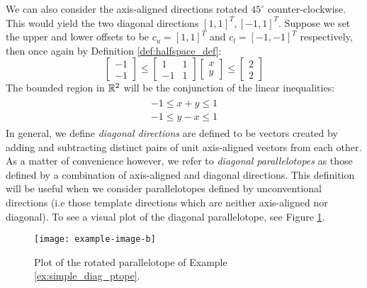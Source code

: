 \begin{example}
  \label{ex:simple_diag_ptope}
  We can also consider the axis-aligned directions rotated $45^\circ$ counter-clockwise. This would yield the two diagonal directions $[1,1]^T, [-1,1]^T$. Suppose we set the upper and lower offsets to be $c_u = [1,1]^T$ and $c_l = [-1,-1]^T$ respectively, then once again by Definition \ref{def:halfspace_def}:
  \begin{equation}
  \begin{bmatrix}
    -1 \\ -1
  \end{bmatrix} \leq \begin{bmatrix}
      1 & 1 \\ -1 & 1
    \end{bmatrix}\begin{bmatrix}
     x \\ y
    \end{bmatrix} \leq \begin{bmatrix}
      2 \\ 2
    \end{bmatrix}
  \end{equation}
  The bounded region in ${\mathbb{R}}^2$ will be the conjunction of the linear inequalities:
  \begin{align}
    \begin{split}
    -1 \leq x + y \leq 1 \\
    -1 \leq y - x \leq 1
    \end{split}
  \end{align}
  In general, we define \emph{diagonal directions} are defined to be vectors created by adding and subtracting distinct pairs of unit axis-aligned vectors from each other. As a matter of convenience however, we refer to \emph{diagonal parallelotopes} as those defined by a combination of axis-aligned and diagonal directions. This definition will be useful when we consider parallelotopes defined by unconventional directions (i.e those template directions which are neither axis-aligned nor diagonal). To see a visual plot of the diagonal parallelotope, see Figure \ref{fig:diagonal_ptope}.

  \begin{figure}
    \centering
    \texttt{[image: example-image-b]}
    \caption{Plot of the rotated parallelotope of Example \ref{ex:simple_diag_ptope}.}
    \label{fig:diagonal_ptope}
  \end{figure}
\end{example}


